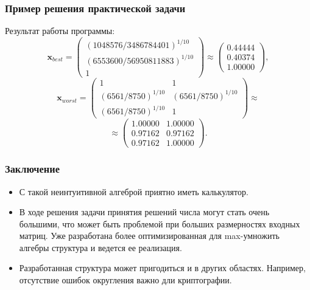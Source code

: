 \documentclass[ucs, notheorems, handout]{beamer}
\begin{document}
\begin{frame}
    \frametitle{Пример решения практической задачи}

Результат работы программы:
$$\bm{x}_{best} =
\begin{pmatrix}
(1048576/3486784401)^{1/10}\\
(6553600/56950811883)^{1/10}\\
1
\end{pmatrix} \approx
\begin{pmatrix}
0.44444\\
0.40374\\
1.00000
\end{pmatrix},
$$
$$\bm{x}_{worst} =
\begin{pmatrix}
1 & 1\\
(6561/8750)^{1/10} & (6561/8750)^{1/10}\\
(6561/8750)^{1/10} & 1
\end{pmatrix} \approx$$
$$\approx
\begin{pmatrix}
1.00000 & 1.00000\\
0.97162 & 0.97162\\
0.97162 & 1.00000
\end{pmatrix}.
$$
    
\end{frame}

\begin{frame}
    \frametitle{Заключение}
    \begin{itemize}
        \item С такой неинтуитивной алгеброй приятно иметь калькулятор.
        
        \item В ходе решения задачи принятия решений числа могут стать очень большими, что может быть проблемой при больших размерностях входных матриц. Уже разработана более оптимизированная для max-умножить алгебры структура и ведется ее реализация.
        
        \item Разработанная структура может пригодиться и в других областях. Например, отсутствие ошибок округления важно дли криптографии.
    \end{itemize}
\end{frame}


%     
% 	

\end{document}

